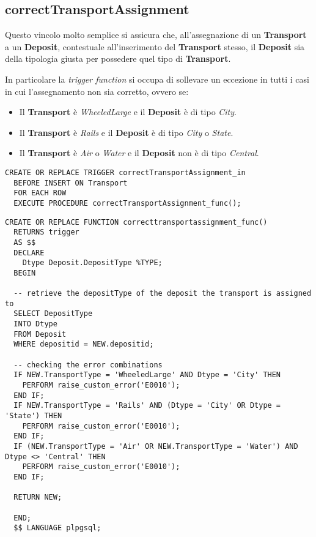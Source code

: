 \subsection{\textbf{correctTransportAssignment}}

Questo vincolo molto semplice si assicura che, all'assegnazione di un \textbf{Transport} a un \textbf{Deposit}, contestuale all'inserimento del \textbf{Transport} stesso, il \textbf{Deposit} sia della tipologia giusta per possedere quel tipo di \textbf{Transport}.

In particolare la \textit{trigger function} si occupa di sollevare un eccezione in tutti i casi in cui l'assegnamento non sia corretto, ovvero se:
\begin{itemize}
  \item Il \textbf{Transport} è \textit{WheeledLarge} e il \textbf{Deposit} è di tipo \textit{City}.
  \item Il \textbf{Transport} è \textit{Rails} e il \textbf{Deposit} è di tipo \textit{City} o \textit{State}.
  \item Il \textbf{Transport} è \textit{Air} o \textit{Water} e il \textbf{Deposit} non è di tipo \textit{Central}.
\end{itemize}

\begin{lstlisting}[caption={Trigger per il vincolo \textbf{correctTransportAssignment}}]
  CREATE OR REPLACE TRIGGER correctTransportAssignment_in
  BEFORE INSERT ON Transport
  FOR EACH ROW
  EXECUTE PROCEDURE correctTransportAssignment_func();
\end{lstlisting}

\begin{lstlisting}[caption={Funzione per il vincolo \textbf{correctTransportAssignment}}]
  CREATE OR REPLACE FUNCTION correcttransportassignment_func() 
  RETURNS trigger
  AS $$
  DECLARE
    Dtype Deposit.DepositType %TYPE;
  BEGIN

  -- retrieve the depositType of the deposit the transport is assigned to
  SELECT DepositType
  INTO Dtype
  FROM Deposit
  WHERE depositid = NEW.depositid;

  -- checking the error combinations
  IF NEW.TransportType = 'WheeledLarge' AND Dtype = 'City' THEN
    PERFORM raise_custom_error('E0010');
  END IF;
  IF NEW.TransportType = 'Rails' AND (Dtype = 'City' OR Dtype = 'State') THEN
    PERFORM raise_custom_error('E0010');
  END IF;
  IF (NEW.TransportType = 'Air' OR NEW.TransportType = 'Water') AND Dtype <> 'Central' THEN
    PERFORM raise_custom_error('E0010');
  END IF;

  RETURN NEW;

  END;
  $$ LANGUAGE plpgsql;
\end{lstlisting}

